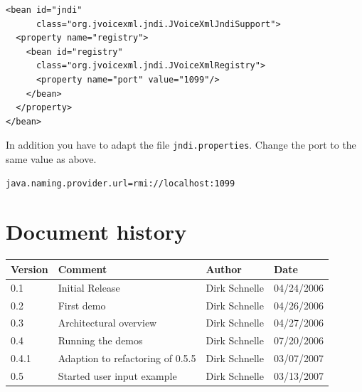 \documentclass[11pt,a4paper]{article}
\begin{document}
\begin{lstlisting}
<bean id="jndi" 
      class="org.jvoicexml.jndi.JVoiceXmlJndiSupport">
  <property name="registry">
    <bean id="registry"
      class="org.jvoicexml.jndi.JVoiceXmlRegistry">
      <property name="port" value="1099"/>
	</bean>
  </property>
</bean>
\end{lstlisting}

In addition you have to adapt the file \texttt{jndi.properties}.
Change the port to the same value as above.

\begin{lstlisting}
java.naming.provider.url=rmi://localhost:1099
\end{lstlisting}

\section*{Document history}

\begin{tabular}{|l|p{5cm}|l|l|}
\hline
\textbf{Version} & \textbf{Comment} & \textbf{Author} & \textbf{Date} \\
\hline
\hline
0.1 & Initial Release & Dirk Schnelle & 04/24/2006 \\
\hline
0.2 & First demo & Dirk Schnelle & 04/26/2006 \\
\hline
0.3 & Architectural overview & Dirk Schnelle & 04/27/2006 \\
\hline
0.4 & Running the demos & Dirk Schnelle & 07/20/2006 \\
\hline
0.4.1 & Adaption to refactoring of 0.5.5 & Dirk Schnelle & 03/07/2007 \\
\hline
0.5 & Started user input example & Dirk Schnelle & 03/13/2007 \\
\hline
\end{tabular}




\end{document}
